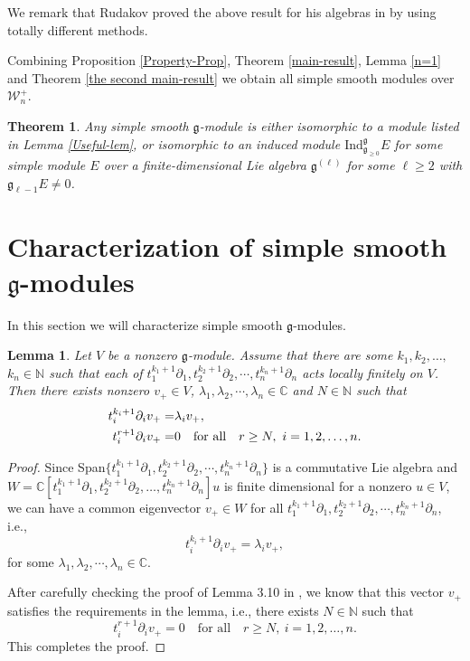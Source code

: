 \documentclass[12pt, a4paper]{amsart}
\newcommand{\fg}{\mathfrak g}
\newcommand{\N}{\mathbb N}
\theoremstyle{Theorem}
\theoremstyle{Theorem}
\newtheorem{lemma}[thm]{Lemma}
\newtheorem{theorem}[thm]{Theorem}
\numberwithin{equation}{section}
\begin{document}
We remark that Rudakov  proved the above result   for his algebras in \cite{R} by using totally different methods. 

Combining   {Proposition \ref{Property-Prop}}, Theorem \ref{main-result},   {Lemma \ref{n=1}} and Theorem \ref{the second main-result} we obtain all simple smooth 
modules over $\mathcal{W}_{n}^{+}$.

\begin{theorem}\label{result} Any simple smooth $\fg$-module is either  isomorphic
to a   module   listed in Lemma \ref{Useful-lem}, or  isomorphic to an induced module $ \mathrm{Ind}_{\mathfrak{g}_{\geq0}}^{\mathfrak{g}}E$ for some simple   module $E$ over a finite-dimensional  Lie algebra $\mathfrak{g}^{(\ell)}$ for some $\ell\ge 2$ with $\mathfrak{g}_{\ell-1}E\ne0$.
 \end{theorem}



\section{Characterization of simple smooth $\fg$-modules}

In this section we will characterize simple smooth $\fg$-modules.

\begin{lemma}\label{L5.1}
	Let $V$ be a nonzero $\fg$-module. Assume that there are  some $k_{1},k_{2},\dots,$ $k_{n}\in\N$ such that each of $t_{1}^{k_{1}+1}\partial_{1},t_{2}^{k_{2}+1}\partial_{2},\cdots,t_{n}^{k_{n}+1}\partial_{n}$
	acts locally finitely on $V$. Then   there exists nonzero $v_+\in V$, $\lambda_1,\lambda_2, \cdots, \lambda_n\in\mathbb{C}$  and $N\in\N$ such that 
	\[\aligned t_{i}^{k_{i}+1}\partial_{i}v_+=&\lambda_iv_+,\\
t_{i}^{r +1}\partial_{i}v_+=&0\quad \text{for all}\quad r \geq N,\ i=1,2,\dots,n.\endaligned\]
\end{lemma}

\begin{proof}  Since Span$\{t_{1}^{k_{1}+1}\partial_{1},t_{2}^{k_{2}+1}\partial_{2},
     \cdots,t_{n}^{k_{n}+1}\partial_{n}\}$ is a commutative Lie algebra and 
     $W=\mathbb{C}[t_{1}^{k_{1}+1}\partial_{1},t_{2}^{k_{2}+1}\partial_{2},
     \dots,t_{n}^{k_{n}+1}\partial_{n}]u$
     is finite dimensional for a nonzero $u\in V$, we can have a common eigenvector $v_+\in W$ for all $t_{1}^{k_{1}+1}\partial_{1},t_{2}^{k_{2}+1}\partial_{2},
     \cdots,t_{n}^{k_{n}+1}\partial_{n}$, i.e.,
      $$t_{i}^{k_{i}+1}\partial_{i}v_+=\lambda_iv_+,$$
     for some $\lambda_1,\lambda_2, \cdots, \lambda_n\in\mathbb{C}$.
     
     
     After carefully checking the proof of  Lemma 3.10 in \cite{MNTZ}, we know that  this vector $v_+$ satisfies the requirements in the lemma, i.e., there exists     $N\in\mathbb{N}$ such that  
	\[t_{i}^{r +1}\partial_{i}v_+=0\quad \text{for all}\quad r \geq N,\ i=1,2,\dots,n.\]   
    This completes the proof.
\end{proof}
\end{document}
